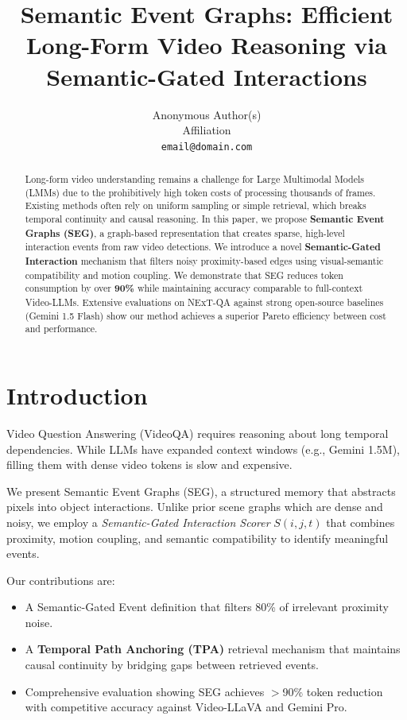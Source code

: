 \documentclass[10pt,twocolumn,letterpaper]{article}
\begin{document}
\title{Semantic Event Graphs: Efficient Long-Form Video Reasoning via Semantic-Gated Interactions}

\author{Anonymous Author(s)\\
Affiliation\\
{\tt\small email@domain.com}
}

\maketitle

\begin{abstract}
Long-form video understanding remains a challenge for Large Multimodal Models (LMMs) due to the prohibitively high token costs of processing thousands of frames. Existing methods often rely on uniform sampling or simple retrieval, which breaks temporal continuity and causal reasoning. In this paper, we propose \textbf{Semantic Event Graphs (SEG)}, a graph-based representation that creates sparse, high-level interaction events from raw video detections. We introduce a novel \textbf{Semantic-Gated Interaction} mechanism that filters noisy proximity-based edges using visual-semantic compatibility and motion coupling. We demonstrate that SEG reduces token consumption by over \textbf{90\%} while maintaining accuracy comparable to full-context Video-LLMs. Extensive evaluations on NExT-QA against strong open-source baselines (Gemini 1.5 Flash) show our method achieves a superior Pareto efficiency between cost and performance.
\end{abstract}

\section{Introduction}
Video Question Answering (VideoQA) requires reasoning about long temporal dependencies. While LLMs have expanded context windows (e.g., Gemini 1.5M), filling them with dense video tokens is slow and expensive.

We present Semantic Event Graphs (SEG), a structured memory that abstracts pixels into object interactions. Unlike prior scene graphs which are dense and noisy, we employ a \textit{Semantic-Gated Interaction Scorer} $S(i,j,t)$ that combines proximity, motion coupling, and semantic compatibility to identify meaningful events.

Our contributions are:
\begin{itemize}
    \item A Semantic-Gated Event definition that filters 80\% of irrelevant proximity noise.
    \item A \textbf{Temporal Path Anchoring (TPA)} retrieval mechanism that maintains causal continuity by bridging gaps between retrieved events.
    \item Comprehensive evaluation showing SEG achieves $>$90\% token reduction with competitive accuracy against Video-LLaVA and Gemini Pro.
\end{itemize}
\end{document}
